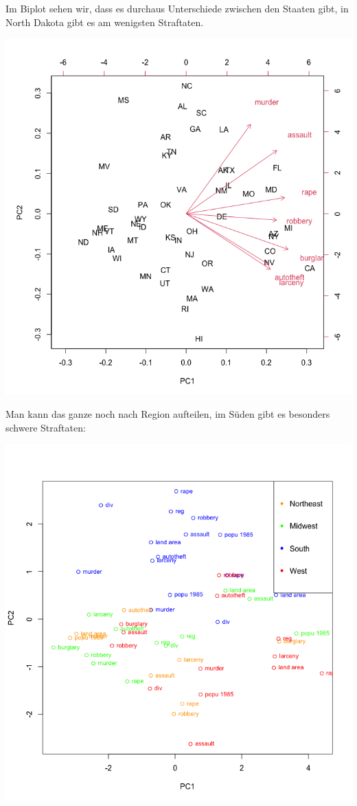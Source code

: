 \documentclass{article}
\begin{document}
	Im Biplot sehen wir, dass es durchaus Unterschiede zwischen den Staaten gibt, in North Dakota gibt es am wenigsten Straftaten.
	\begin{center}
		\includegraphics[scale=0.3]{2_3_biplot}
	\end{center}
	Man kann das ganze noch nach Region aufteilen, im Süden gibt es besonders schwere Straftaten:
	\begin{center}
		\includegraphics[scale=0.3]{2_3_location}
	\end{center}
\end{document}

